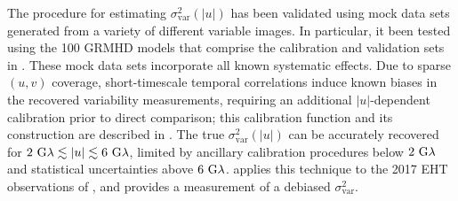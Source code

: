 The procedure for estimating $\sigma_\text{var}^2 (|u|)$ has been validated using mock data sets generated from a variety of different variable images.  In particular, it been tested using the 100 GRMHD models that comprise the calibration and validation sets in .  These mock data sets incorporate all known systematic effects.  Due to sparse $(u,v)$ coverage, short-timescale temporal correlations induce known biases in the recovered variability measurements, requiring an additional $|u|$-dependent calibration prior to direct comparison; this calibration function and its construction are described in \citealt{NoiseModeling}.  The true $\sigma_\text{var}^2 (|u|)$ can be accurately recovered for $2~{\rm G}\lambda\lesssim|u|\lesssim6~{\rm G}\lambda$, limited by ancillary calibration procedures below $2~{\rm G}\lambda$ and statistical uncertainties above $6~{\rm G}\lambda$.   applies this technique to the 2017 EHT observations of \sgra, and provides a measurement of a debiased $\sigma_\text{var}^2$.



